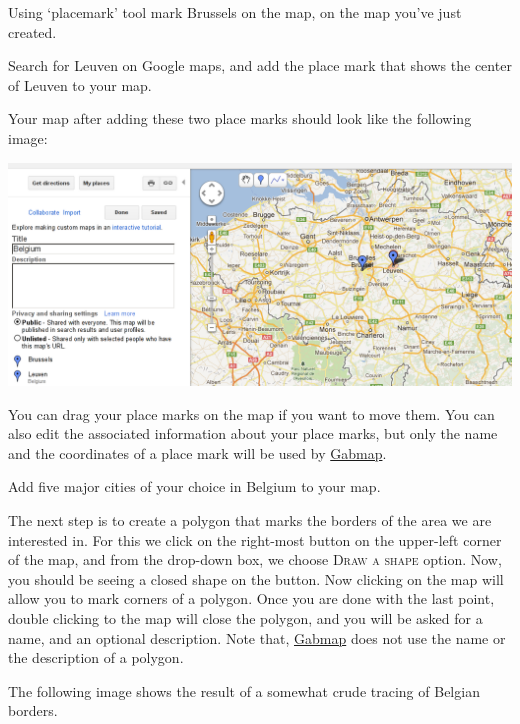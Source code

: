 \documentclass{article}
\newcommand{\gabmap}{\href{http://www.gabmap.nl/}{Gabmap}}
\begin{document}
\begin{Exercise}
Using `placemark' tool mark Brussels on the map, on the map you've
just created.
\end{Exercise}

\begin{Exercise}
Search for Leuven on Google maps, and add the place mark that shows the
center of Leuven to your map.
\end{Exercise}

Your map after adding these two place marks should look like the
following image:

\begin{center}
\includegraphics[width=\textwidth]{images/google-maps-placemarks.png}
\end{center}

You can drag your place marks on the map if you want to move them. You
can also edit the associated information about your place marks, but
only the name and the coordinates of a place mark will be used by
\gabmap{}.

\begin{Exercise}
Add five major cities of your choice in Belgium to your map.
\end{Exercise}

The next step is to create a polygon that marks the borders of the
area we are interested in. For this we click on the right-most button
on the upper-left corner of the map, and from the drop-down box, we
choose \textsc{Draw a shape} option. Now, you should be seeing a closed
shape on the button. Now clicking on the map will allow you to mark
corners of a polygon. Once you are done with the last
point, double clicking to the map will close the polygon, and you will
be asked for a name, and an optional description. Note that, \gabmap{}
does not use the name or the description of a polygon.

The following image shows the result of a somewhat crude tracing of
Belgian borders. 
\end{document}
